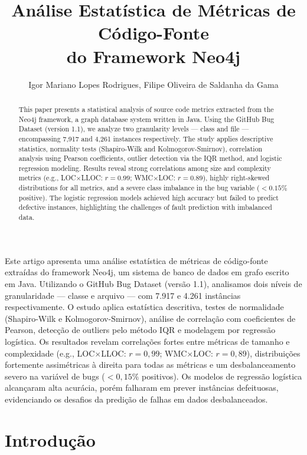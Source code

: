 \documentclass[12pt]{article}
\title{Análise Estatística de Métricas de Código-Fonte\\do Framework Neo4j}
\author{Igor Mariano Lopes Rodrigues\inst{1}, Filipe Oliveira de Saldanha da Gama\inst{1}}
\begin{document}
\maketitle

\begin{abstract}
This paper presents a statistical analysis of source code metrics extracted from the Neo4j framework, a graph database system written in Java. Using the GitHub Bug Dataset (version 1.1), we analyze two granularity levels --- class and file --- encompassing 7{,}917 and 4{,}261 instances respectively. The study applies descriptive statistics, normality tests (Shapiro-Wilk and Kolmogorov-Smirnov), correlation analysis using Pearson coefficients, outlier detection via the IQR method, and logistic regression modeling. Results reveal strong correlations among size and complexity metrics (e.g., LOC$\times$LLOC: $r = 0.99$; WMC$\times$LOC: $r = 0.89$), highly right-skewed distributions for all metrics, and a severe class imbalance in the bug variable ($<0.15\%$ positive). The logistic regression models achieved high accuracy but failed to predict defective instances, highlighting the challenges of fault prediction with imbalanced data.
\end{abstract}

\begin{resumo}
Este artigo apresenta uma análise estatística de métricas de código-fonte extraídas do framework Neo4j, um sistema de banco de dados em grafo escrito em Java. Utilizando o GitHub Bug Dataset (versão 1.1), analisamos dois níveis de granularidade --- classe e arquivo --- com 7.917 e 4.261 instâncias respectivamente. O estudo aplica estatística descritiva, testes de normalidade (Shapiro-Wilk e Kolmogorov-Smirnov), análise de correlação com coeficientes de Pearson, detecção de outliers pelo método IQR e modelagem por regressão logística. Os resultados revelam correlações fortes entre métricas de tamanho e complexidade (e.g., LOC$\times$LLOC: $r = 0{,}99$; WMC$\times$LOC: $r = 0{,}89$), distribuições fortemente assimétricas à direita para todas as métricas e um desbalanceamento severo na variável de bugs ($<0{,}15\%$ positivos). Os modelos de regressão logística alcançaram alta acurácia, porém falharam em prever instâncias defeituosas, evidenciando os desafios da predição de falhas em dados desbalanceados.
\end{resumo}

\section{Introdução} \label{sec:intro}
\end{document}
